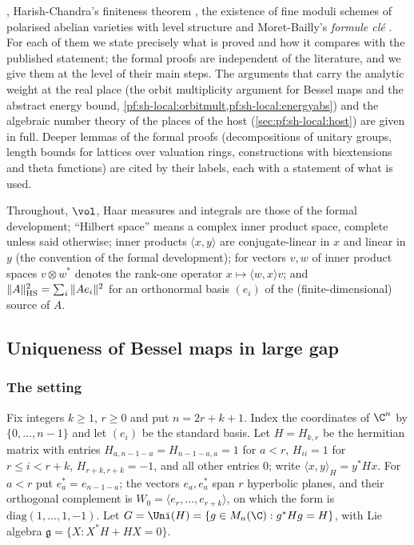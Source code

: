 \cite{AizenbudGourevitchRallisSchiffmann2010,SunZhu2012,JiangSunZhu2010}, Harish-Chandra's finiteness theorem
\cite{HarishChandra1968}, the existence of fine moduli schemes of polarised abelian varieties with level structure
\cite{MumfordFogartyKirwan1994} and Moret-Bailly's \emph{formule cl\'e} \cite{MoretBailly1985}. For each of them we
state precisely what is proved and how it compares with the published statement; the formal proofs are
independent of the literature, and we give them at the level of their main steps. The arguments that carry the
analytic weight at the real place (the orbit multiplicity argument for Bessel maps and the abstract energy bound,
\cref{pf:sh-local:orbitmult,pf:sh-local:energyabs}) and the algebraic number theory of the places of the host
(\cref{sec:pf:sh-local:host}) are given in full. Deeper lemmas of the formal proofs (decompositions of unitary
groups, length bounds for lattices over valuation rings, constructions with biextensions and theta functions) are
cited by their labels, each with a statement of what is used.

Throughout, $\vol$, Haar measures and integrals are those of the formal development; ``Hilbert space'' means a
complex inner product space, complete unless said otherwise; inner products $\langle x,y\rangle$ are conjugate-linear in
$x$ and linear in $y$ (the convention of the formal development); for vectors $v,w$ of inner product spaces
$v\otimes w^*$ denotes the rank-one operator $x\mapsto\langle w,x\rangle v$; and $\|A\|_{\mathrm{HS}}^2=\sum_i\|Ae_i\|^2$ for an
orthonormal basis $(e_i)$ of the (finite-dimensional) source of $A$.

\subsection{Uniqueness of Bessel maps in large gap}\label{sec:pf:sh-local:bessel}

\subsubsection{The setting}
Fix integers $k\ge1$, $r\ge0$ and put $n=2r+k+1$. Index the coordinates of $\C^n$ by $\{0,\dots,n-1\}$ and let
$(e_i)$ be the standard basis. Let $H=H_{k,r}$ be the hermitian matrix with entries $H_{a,n-1-a}=H_{n-1-a,a}=1$
for $a<r$, $H_{ii}=1$ for $r\le i<r+k$, $H_{r+k,r+k}=-1$, and all other entries $0$; write
$\langle x,y\rangle_H=y^*Hx$. For $a<r$ put $e_a^*=e_{n-1-a}$; the vectors $e_a,e_a^*$ span $r$ hyperbolic planes,
and their orthogonal complement is $W_0=\langle e_r,\dots,e_{r+k}\rangle$, on which the form is
$\mathrm{diag}(1,\dots,1,-1)$. Let $G=\Uni(H)=\{g\in M_n(\C):g^*Hg=H\}$, with Lie algebra
$\mathfrak g=\{X:X^*H+HX=0\}$.

